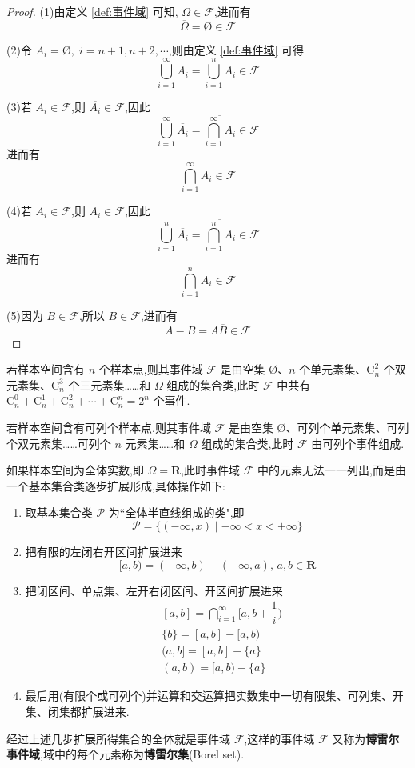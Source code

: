 \begin{proof}
    (1)由定义 \ref{def:事件域} 可知, $\varOmega \in \mathcal{F}$,进而有
    $$
    \overline{\varOmega} = \text{\O} \in \mathcal{F}
    $$

    (2)令 $A_{i} = \text{\O},\; i = n+1, n+2, \cdots$,则由定义 \ref{def:事件域} 可得
    $$
    \bigcup_{i=1}^{\infty} A_i = \bigcup_{i=1}^{n} A_i \in \mathcal{F}
    $$

    (3)若 $A_i \in \mathcal{F}$,则 $\overline{A_i} \in \mathcal{F}$,因此
    $$
    \bigcup_{i=1}^{\infty} \overline{A_i} = \overline{\bigcap_{i=1}^{\infty} A_i} \in \mathcal{F}
    $$
    进而有
    $$
    \bigcap_{i=1}^{\infty} A_i \in \mathcal{F}
    $$

    (4)若 $A_i \in \mathcal{F}$,则 $\overline{A_i} \in \mathcal{F}$,因此
    $$
    \bigcup_{i=1}^{n} \overline{A_i} = \overline{\bigcap_{i=1}^{n} A_i} \in \mathcal{F}
    $$
    进而有
    $$
    \bigcap_{i=1}^{n} A_i \in \mathcal{F}
    $$

    (5)因为 $B \in \mathcal{F}$,所以 $\overline{B} \in \mathcal{F}$,进而有
    $$
    A-B = A \overline{B} \in \mathcal{F}
    $$
\end{proof}

若样本空间含有 $n$ 个样本点,则其事件域 $\mathcal{F}$ 是由空集 $\text{\O}$、$n$ 个单元素集、$\mathrm{C}_n^2$ 个双元素集、$\mathrm{C}_n^3$ 个三元素集……和 $\varOmega$ 组成的集合类,此时 $\mathcal{F}$ 中共有 $\mathrm{C}_n^0 + \mathrm{C}_n^1 + \mathrm{C}_n^2 + \cdots + \mathrm{C}_n^n = 2^n$ 个事件.

若样本空间含有可列个样本点,则其事件域 $\mathcal{F}$ 是由空集 $\text{\O}$、可列个单元素集、可列个双元素集……可列个 $n$ 元素集……和 $\varOmega$ 组成的集合类,此时 $\mathcal{F}$ 由可列个事件组成.

如果样本空间为全体实数,即 $\varOmega = \mathbf{R}$,此时事件域 $\mathcal{F}$ 中的元素无法一一列出,而是由一个基本集合类逐步扩展形成,具体操作如下:
\begin{enumerate}
    \item 取基本集合类 $\mathcal{P}$ 为``全体半直线组成的类",即
    $$
    \mathcal{P} = \{ (-\infty, x) \mid -\infty < x < +\infty \}
    $$
    \item 把有限的左闭右开区间扩展进来
    $$
    [a,b) = (-\infty,b) - (-\infty,a), \, a,b \in \mathbf{R}
    $$
    \item 把闭区间、单点集、左开右闭区间、开区间扩展进来
    $$
    \begin{aligned}
        & [a,b] = \bigcap_{i=1}^{\infty} \Big[ a, b + \dfrac{1}{i} \Big) \\
        & \{ b \} = [a,b] - [a,b) \\
        & (a,b] = [a,b] - \{ a \} \\
        & (a,b) = [a,b) - \{ a \}
    \end{aligned}
    $$
    \item 最后用(有限个或可列个)并运算和交运算把实数集中一切有限集、可列集、开集、闭集都扩展进来.
\end{enumerate}
经过上述几步扩展所得集合的全体就是事件域 $\mathcal{F}$,这样的事件域 $\mathcal{F}$ 又称为\textbf{博雷尔事件域},域中的每个元素称为\textbf{博雷尔集}(Borel set).

